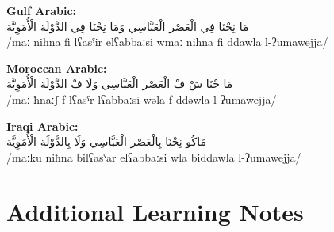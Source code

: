 \documentclass[letterpaper,12pt]{article}
\begin{document}
\textbf{Gulf Arabic:}\\
\textarabic{مَا نِحْنَا فِي الْعَصْر الْعَبَّاسِي وَمَا نِحْنَا فِي الدَّوْلَة الْأُمَوِيَّة}\\
/maː niħna fi lʕasˤir elʕabbaːsi wmaː niħna fi ddawla l-ʔumawejja/

\textbf{Moroccan Arabic:}\\
\textarabic{مَا حْنَا شْ فْ الْعَصْر الْعَبَّاسِي وَلَا فْ الدَّوْلَة الْأُمَوِيَّة}\\
/maː ħnaːʃ f lʕasˤr lʕabbaːsi wəla f ddəwla l-ʔumawejja/

\textbf{Iraqi Arabic:}\\
\textarabic{مَاكُو نِحْنَا بِالْعَصْر الْعَبَّاسِي وَلَا بِالدَّوْلَة الْأُمَوِيَّة}\\
/maːku niħna bilʕasˤar elʕabbaːsi wla biddawla l-ʔumawejja/

\section{Additional Learning Notes}
\end{document}
